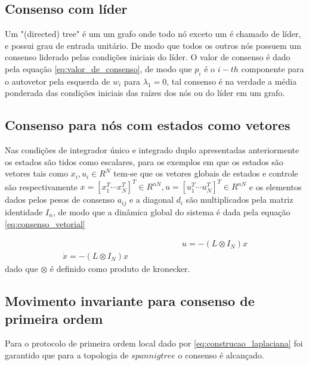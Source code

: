 \subsection{Consenso com líder}
Um "(directed) tree" é um um grafo onde todo nó exceto um é chamado de líder, e possui grau de entrada unitário. De modo que todos os outros nós possuem um consenso liderado pelas condições iniciais do líder.
O valor de consenso é dado pela equação \ref{eq:valor_de_consenso}, de modo que $p_{i}$ é o $i-{th}$ componente para o autovetor pela esquerda de $w_{i}$ para $\lambda_{1} = 0$, tal consenso é na verdade a média ponderada das condições iniciais das raízes dos nós ou do líder em um grafo. 

\subsection{Consenso para nós com estados como vetores}
Nas condições de integrador único e integrado duplo apresentadas anteriormente os estados são tidos como escalares, para os exemplos em que os estados são vetores tais como $x_{i}, u_{i} \in R^{N}$ tem-se que os vetores globais de estados e controle são respectivamente $x = [x_{1}^{T} \cdots x_{N}^{T}]^{T} \in R^{nN} , 
u = [u_{1}^{T}  \cdots u_{N}^{T}]^{T} \in R^{nN} $ e os elementos dados pelos pesos de consenso $a_{ij}$ e a diagonal $d_{i}$ são multiplicados pela matriz identidade $I_{n}$, de modo que a dinâmica global do sistema é dada pela equação \ref{eq:consenso_vetorial}

\begin{equation}\label{eq:consenso_vetorial}
 \begin{aligned}
 \hspace{6cm} %
    u = -(L \otimes I_{N})x \\
    \dot x = -(L \otimes I_{N}) x
    \end{aligned}
\end{equation}
dado que $\otimes$ é definido como produto de kronecker.

\subsection{Movimento invariante para consenso de primeira ordem}
Para o protocolo de primeira ordem local dado por \ref{eq:construcao_laplaciana} foi garantido que para a topologia de $spannig tree$ o consenso é alcançado. 


